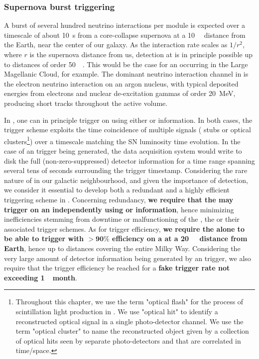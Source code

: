 \subsubsection{Supernova burst triggering}

A burst of several hundred neutrino interactions per \dune {} module is expected over a timescale of about \SI{10}{\s} from a core-collapse supernova at a \SI{10}{\kilo\parsec} distance from the Earth, near the center of our galaxy. As the  interaction rate scales as $1/r^2$, where $r$ is the supernova distance from us,  detection at \dune is in principle possible up to distances of order \SI{50}{\kilo\parsec}. This would be the case for an  occurring in the Large Magellanic Cloud, for example. The dominant neutrino interaction channel in \dune is the  electron neutrino interaction on an argon nucleus, with typical deposited energies from electrons and nuclear de-excitation gammas of order 20~MeV, producing short tracks throughout the  active volume.

In \dune, one can in principle trigger on  using either  or  information. In both cases, the trigger scheme exploits the time coincidence of multiple signals ( stubs or  optical clusters\footnote{Throughout this chapter, we use the term "optical flash" for the process of scintillation light production in . We use "optical hit" to identify a reconstructed optical signal in a single photo-detector channel. We use the term "optical cluster" to name the reconstructed object given by a collection of optical hits seen by separate photo-detectors and that are correlated in time/space.}) over a timescale matching the SN luminosity time evolution. In the case of an  trigger being generated, the data acquisition system would write to disk the full (non-zero-suppressed) detector information for a time range spanning several tens of seconds surrounding the trigger timestamp. Considering the rare nature of  in our galactic neighbourhood, and given the importance of  detection, we consider it essential to develop both a redundant and a highly efficient  triggering scheme in . Concerning redundancy, {\bf we require that the \dune {} may trigger on an  independently using  or  information}, hence minimizing  inefficiencies stemming from downtime or malfunctioning of the , the  or their associated trigger schemes. As for trigger efficiency, {\bf we require the  alone to be able to trigger with $\boldsymbol{>90\%}$ efficiency on a  at a \SI{20}{\kilo\parsec} distance from Earth}, hence up to distances covering the entire Milky Way. Considering the very large amount of detector information being generated by an  trigger, we also require that the  trigger efficiency be reached for a {\bf fake trigger rate not exceeding \SI{1}{\per month}}.

